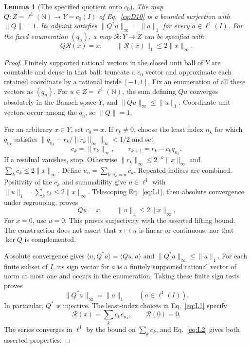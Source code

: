 \documentclass[11pt]{article}
\newcommand{\N}{\mathbb N}
\newcommand{\pair}[2]{\langle #1,#2\rangle}
\newtheorem{lemma}{Lemma}
\theoremstyle{definition}
\theoremstyle{remark}
\begin{document}
\begin{lemma}[The specified quotient onto $c_0$]
\label{lem:specified-quotient}
The map $Q:Z=\ell^1(\N)\to Y=c_0(I)$ of Eq.~\eqref{eq:D10} is a
bounded surjection with $\|Q\|=1$. Its adjoint satisfies
$\|Q^*a\|_\infty=\|a\|_1$ for every $a\in\ell^1(I)$.
For the fixed enumeration $(q_n)$, a map $\mathcal R:Y\to Z$ can be
specified with
\[
Q\mathcal R(x)=x,\qquad \|\mathcal R(x)\|_1\le2\|x\|_\infty.
\]
\end{lemma}
\begin{proof}
\label{sec:L1}
Finitely supported rational vectors in the closed unit ball of $Y$ are
countable and dense in that ball: truncate a $c_0$ vector and approximate
each retained coordinate by a rational inside $[-1,1]$. Fix an enumeration
of all these vectors as $(q_n)$. For $u\in Z=\ell^1(\N)$, the sum defining
$Qu$ converges absolutely in the Banach space $Y$, and
$\|Qu\|_\infty\le\|u\|_1$. Coordinate unit vectors occur among the $q_n$,
so $\|Q\|=1$.

For an arbitrary $x\in Y$, set $r_0=x$. If $r_k\ne0$, choose the least index $n_k$ for which
$q_{n_k}$ satisfies $\|q_{n_k}-r_k/\|r_k\|_\infty\|_\infty<1/2$ and set
\begin{equation}
c_k=\|r_k\|_\infty,\qquad r_{k+1}=r_k-c_kq_{n_k}.
\label{eq:L1}
\end{equation}
If a residual vanishes, stop. Otherwise
$\|r_k\|_\infty\le2^{-k}\|x\|_\infty$ and $\sum_k c_k\le2\|x\|_\infty$.
Define $u_n=\sum_{k:n_k=n}c_k$. Repeated indices are combined.
Positivity of the $c_k$ and summability give $u\in\ell^1$ with
$\|u\|_1=\sum_k c_k\le2\|x\|_\infty$.
Telescoping Eq.~\eqref{eq:L1}, then absolute convergence under regrouping,
proves
\begin{equation}
Qu=x,\qquad \|u\|_1\le2\|x\|_\infty.
\label{eq:L2}
\end{equation}
For $x=0$, use $u=0$. This proves surjectivity with the asserted lifting
bound. The construction does not assert that $x\mapsto u$ is linear or
continuous, nor that $\ker Q$ is complemented.

\label{sec:L2}
Absolute convergence gives $\pair{u}{Q^*a}=\pair{Qu}{a}$ and
$\|Q^*a\|_\infty\le\|a\|_1$. For each finite subset of $I$, its sign
vector for $a$ is a finitely supported rational vector of norm at most
one and occurs in the enumeration. Taking these finite sign tests proves
\begin{equation}
\|Q^*a\|_\infty=\|a\|_1\qquad(a\in\ell^1(I)).
\label{eq:L3}
\end{equation}
In particular, $Q^*$ is injective. The least-index choices in
Eq.~\eqref{eq:L1} specify
\[
\mathcal R(x)=\sum_k c_k e_{n_k},\qquad \mathcal R(0)=0.
\]
The series converges in $\ell^1$ by the bound on $\sum_k c_k$,
and Eq.~\eqref{eq:L2} gives both asserted properties.
\end{proof}
\end{document}
